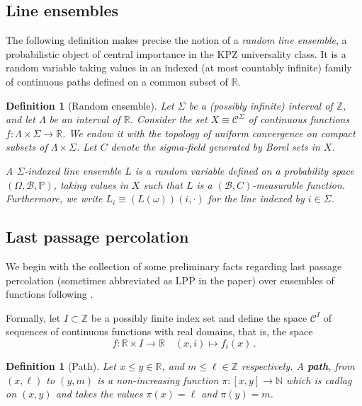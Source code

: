 \documentclass[11pt, reqno]{amsart}
\numberwithin{equation}{section}
\newcounter{dummy} \numberwithin{dummy}{section}
\newtheorem{definition}[dummy]{Definition}
\newcommand{\R}{\ensuremath{\mathbb{R}}}
\newcommand{\Z}{\ensuremath{\mathbb{Z}}}
\newcommand{\PP}{\ensuremath{\mathbb{P}}}
\begin{document}
\subsection{Line ensembles} The following definition makes precise the notion of a \emph{random line ensemble}, a probabilistic object of central importance in the KPZ universality class. It is a random variable taking values in an indexed (at most countably infinite) family of continuous paths defined on a common subset of $\R$. 


\begin{definition}[Random ensemble]\label{def: random ensemble}
    Let $\Sigma$ be a (possibly infinite) interval of $\Z$, and let $\Lambda$ be an interval of $\R$. Consider the set \(X\equiv \mathscr{C}^\Sigma\) of continuous functions $f: \Lambda \times\Sigma\rightarrow \R$. We endow it with the topology of uniform convergence on compact subsets of $\Lambda \times\Sigma$. Let $C$ denote the sigma-field  generated by Borel sets in $X$.

    A {\it $\Sigma$-indexed line ensemble} $L$ is a random variable defined on a probability space $(\Omega,\mathcal{B},\PP)$, taking values in $X$ such that $L$ is a $(\mathcal{B},C)$-measurable function. Furthermore, we write $L_i\equiv(L(\omega))(i,\cdot)$ for the line indexed by $i\in\Sigma$. 
\end{definition}%

\subsection{Last passage percolation} We begin with the collection of some preliminary facts regarding last passage percolation (sometimes abbreviated as LPP in the paper) over ensembles of functions following \cite{DOV}.

Formally, let \(I\subset \mathbb{Z}\) be a possibly finite index set and define the space \(\mathscr{C}^{I}\) of sequences of continuous functions with real domains, that is, the space
\begin{equation*}f: \mathbb{R}\times I\to \mathbb{R}\quad (x,i)\mapsto f_i(x)\,.\end{equation*}

\begin{definition}[Path] Let \(x\leq y \in \mathbb{R}\), and \(m\leq \ell \in \mathbb{Z}\) respectively. A \textbf{path}, from \((x,\ell)\) to \((y,m)\) is a non-increasing  function \(\pi: [x,y] \to \mathbb{N}\) which is cadlag on \((x,y)\) and takes the values \(\pi(x)= \ell\) and \(\pi(y)= m\).
\label{def: path}
\end{definition}%
\end{document}
